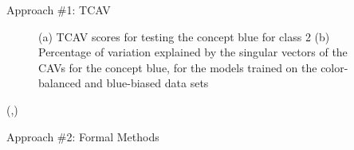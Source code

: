 \documentclass[final]{beamer}
\begin{document}
\begin{frame}[fragile]{}
\begin{textblock}{\colwidth}
\begin{paddedBlock}{Approach \#1: TCAV}
\begin{figure}%
    \centering
    \qquad
    \qquad
    \caption{\textcolor{cardinal}{(a)} TCAV scores for testing the concept blue for class 2 \textcolor{cardinal}{(b)} Percentage of variation explained by the singular vectors of the CAVs for the concept blue, for the models trained on the color-balanced and blue-biased data sets}%
    \label{fig:example}%
\end{figure}

\end{paddedBlock}
\end{textblock}


\begin{textblock}{\colwidth}(\thirdcolpos,\vstartCols)




\begin{paddedBlock}{Approach \#2: Formal Methods}


\end{paddedBlock}
\end{textblock}
\end{frame}
\end{document}
